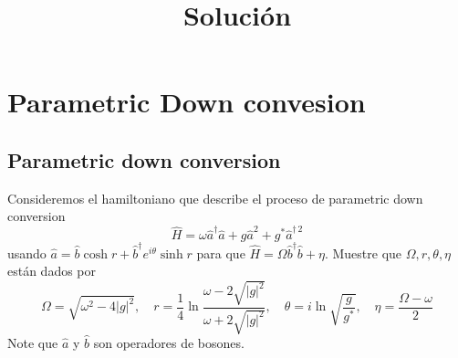 \chapter{Parametric Down convesion}

\section{Parametric down conversion}
Consideremos el hamiltoniano que describe el proceso de parametric down conversion
\begin{equation*}
	\hat{H} = \omega \hat{a}^{\dagger}\hat{a}  + g \hat{a}^{2} + g^{*} \hat{a}^{\dagger\,2}
\end{equation*}
usando $\hat{a} = \hat{b} \cosh{r} + \hat{b}^{\dagger} e^{i\theta} \sinh{r}$ para que $\hat{H} = \Omega \hat{b}^{\dagger}\hat{b} + \eta$. Muestre que $\Omega, r,\theta, \eta$ están dados por
\begin{equation*}
	\Omega = \sqrt{\omega^2 - 4|g|^2}, \quad r=\frac{1}{4}\ln{\frac{\omega - 2\sqrt{|g|^2}}{\omega + 2\sqrt{|g|^2}}}, \quad \theta = i\ln{\sqrt{\frac{g}{g^{*}}}}, \quad \eta = \frac{\Omega - \omega}{2}
\end{equation*}
Note que $\hat{a}$ y $\hat{b}$ son operadores de bosones.

\title{Solución}

